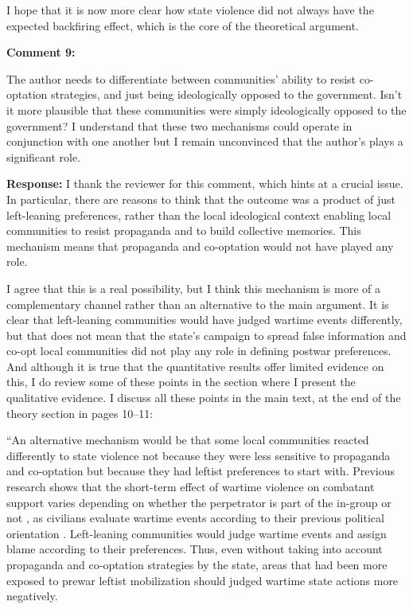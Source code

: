 \documentclass[12pt, a4paper, notitlepage]{article}
\begin{document}
I hope that it is now more clear how state violence did not always have the expected backfiring effect, which is the core of the theoretical argument.

\vspace{15pt}
\noindent\textbf{Comment 9:}
\begin{displayquote}
The author needs to differentiate between communities' ability to resist co-optation strategies, and just being ideologically opposed to the government. Isn't it more plausible that these communities were simply ideologically opposed to the government? I understand that these two mechanisms could operate in conjunction with one another but I remain unconvinced that the author's plays a significant role.
\end{displayquote}

\noindent\textbf{Response:} I thank the reviewer for this comment, which hints at a crucial issue. In particular, there are reasons to think that the outcome was a product of just left-leaning preferences, rather than the local ideological context enabling local communities to resist propaganda and to build collective memories. This mechanism means that propaganda and co-optation would not have played any role.

I agree that this is a real possibility, but I think this mechanism is more of a complementary channel rather than an alternative to the main argument. It is clear that left-leaning communities would have judged wartime events differently, but that does not mean that the state's campaign to spread false information and co-opt local communities did not play any role in defining postwar preferences. And although it is true that the quantitative results offer limited evidence on this, I do review some of these points in the section where I present the qualitative evidence.
I discuss all these points in the main text, at the end of the theory section in pages 10--11:

``An alternative mechanism would be that some local communities reacted differently to state violence not because they were less sensitive to propaganda and co-optation but because they had leftist preferences to start with.
Previous research shows that the short-term effect of wartime violence on combatant support varies depending on whether the perpetrator is part of the in-group or not \citep{Lyall:2013aa}, as civilians evaluate wartime events according to their previous political orientation \citep{Silverman:2019aa, Pechenkina:2020ul}.
Left-leaning communities would judge wartime events and assign blame according to their preferences.
Thus, even without taking into account propaganda and co-optation strategies by the state, areas that had been more exposed to prewar leftist mobilization should judged wartime state actions more negatively.
\end{document}
